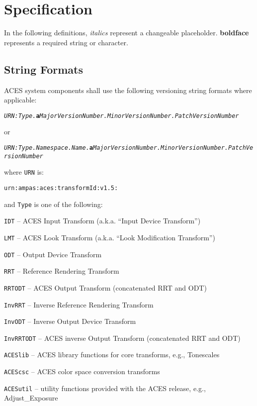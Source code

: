 \regularsectionformat
\newcommand{\urn}[0]{urn:ampas:aces:transformId:v1.5:}

\def\+{\discretionary{}{}{}}

\chapter{Specification}
In the following definitions, \textit{italics} represent a changeable placeholder. \textbf{boldface} represents a required string or character.

\section{String Formats}
ACES system components shall use the following versioning string formats where applicable:

\texttt{\textit{URN:Type.}\textbf{a}\textit{MajorVersionNumber.MinorVersionNumber.PatchVersionNumber}}

or

\texttt{\textit{URN:Type.Namespace.Name.}\textbf{a}\textit{MajorVersionNumber.MinorVersionNumber.PatchVersionNumber}}

where \texttt{URN} is:

\begin{listize}
    \item \texttt{\urn{}}
\end{listize}

and \texttt{Type} is one of the following:

\begin{listize}
    \item \texttt{IDT} -- ACES Input Transform (a.k.a. ``Input Device Transform'')
    \item \texttt{LMT} -- ACES Look Transform (a.k.a. ``Look Modification Transform'')
    \item \texttt{ODT} -- Output Device Transform
    \item \texttt{RRT} -- Reference Rendering Transform
    \item \texttt{RRTODT} -- ACES Output Transform (concatenated RRT and ODT)
    \item \texttt{InvRRT} -- Inverse Reference Rendering Transform
    \item \texttt{InvODT} -- Inverse Output Device Transform
    \item \texttt{InvRRTODT} -- ACES inverse Output Transform (concatenated RRT and ODT)
    \item \texttt{ACESlib} -- ACES library functions for core transforms, e.g., Tonescales
    \item \texttt{ACEScsc} -- ACES color space conversion transforms
    \item \texttt{ACESutil} -- utility functions provided with the ACES release, e.g., Adjust\_Exposure
\end{listize}

